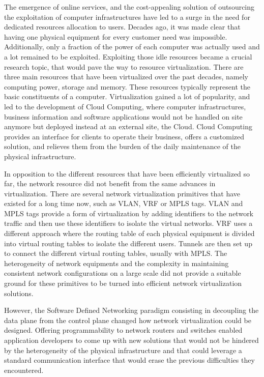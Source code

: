 The emergence of online services, and the cost-appealing solution of outsourcing the exploitation of computer infrastructures have led to a surge in the need for dedicated resources allocation to users. Decades ago, it was made clear that having one physical equipment for every customer need was impossible. Additionally, only a fraction of the power of each computer was actually used and a lot remained to be exploited.
Exploiting those idle resources became a crucial research topic, that would pave the way to resource virtualization. 
There are three main resources that have been virtualized over the past decades, namely computing power, storage and memory.
These resources typically represent the basic constituents of a computer.
Virtualization gained a lot of popularity, and led to the development of Cloud Computing, where computer infrastructures, business information and software applications would not be handled on site anymore but deployed instead at an external site, \ie the Cloud. 
Cloud Computing provides an interface for clients to operate their business, offers a customized solution, and relieves them from the burden of the daily maintenance of the physical infrastructure.

In opposition to the different resources that have been efficiently virtualized so far, the network resource did not benefit from the same advances in virtualization.
There are several network virtualization primitives that have existed for a long time now, such as VLAN, VRF or MPLS tags. VLAN and MPLS tags provide a form of virtualization by adding identifiers to the network traffic and then use these identifiers to isolate the virtual networks. VRF uses a different approach where the routing table of each physical equipment is divided into virtual routing tables to isolate the different users. Tunnels are then set up to connect the different virtual routing tables, usually with MPLS.
The heterogeneity of network equipments and the complexity in maintaining consistent network configurations on a large scale did not provide a suitable ground for these primitives to be turned into efficient network virtualization solutions.

However, the Software Defined Networking paradigm consisting in decoupling the data plane from the control plane changed how network virtualization could be designed. Offering programmability to network routers and switches enabled application developers to come up with new solutions that would not be hindered by the heterogeneity of the physical infrastructure and that could leverage a standard communication interface that would erase the previous difficulties they encountered.

